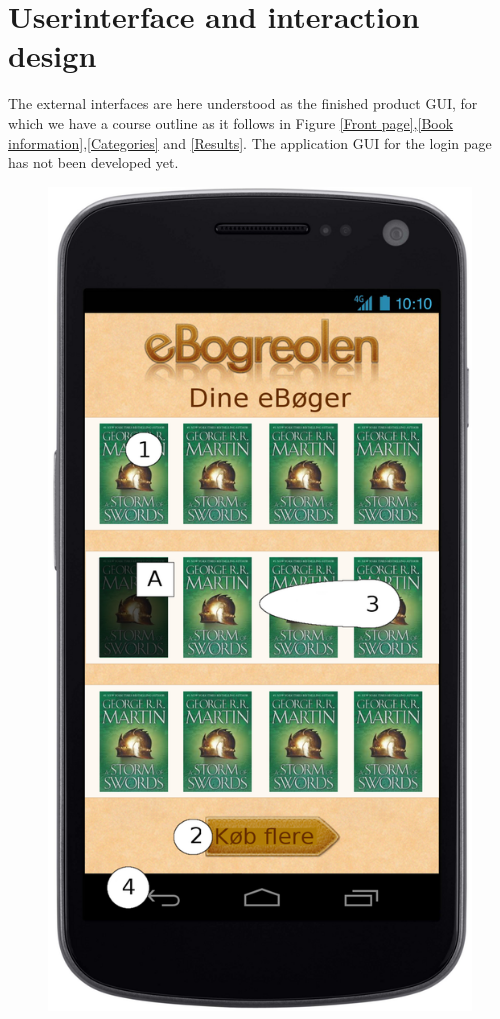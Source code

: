\message{ !name(Rapport.tex)}\documentclass[12pt]{article}
\begin{document}
\section{Userinterface and interaction design}
The external interfaces are here understood as the finished product GUI, for which we have a course outline as it follows in Figure \ref{Front page},\ref{Book information},\ref{Categories} and \ref{Results}. The application GUI for the login page has not been developed yet.
\begin{figure}
\includegraphics[scale=0.7]{gnexforside.png}

\end{figure}
\end{document}
